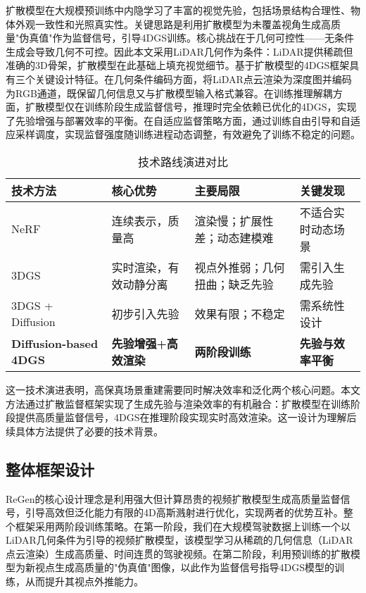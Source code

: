 扩散模型在大规模预训练中内隐学习了丰富的视觉先验，包括场景结构合理性、物体外观一致性和光照真实性。关键思路是利用扩散模型为未覆盖视角生成高质量"伪真值"作为监督信号，引导4DGS训练。核心挑战在于几何可控性——无条件生成会导致几何不可控。因此本文采用LiDAR几何作为条件：LiDAR提供稀疏但准确的3D骨架，扩散模型在此基础上填充视觉细节。基于扩散模型的4DGS框架具有三个关键设计特征。在几何条件编码方面，将LiDAR点云渲染为深度图并编码为RGB通道，既保留几何信息又与扩散模型输入格式兼容。在训练推理解耦方面，扩散模型仅在训练阶段生成监督信号，推理时完全依赖已优化的4DGS，实现了先验增强与部署效率的平衡。在自适应监督策略方面，通过训练自由引导和自适应采样调度，实现监督强度随训练进程动态调整，有效避免了训练不稳定的问题。

\begin{table}[htbp]
\centering
\caption{技术路线演进对比}
\label{tab:technical-evolution}
\small
\begin{tabular}{p{2.2cm}p{3.2cm}p{4cm}p{2.8cm}}
\toprule
\textbf{技术方法} & \textbf{核心优势} & \textbf{主要局限} & \textbf{关键发现} \\
\midrule
NeRF & 连续表示，质量高 & 渲染慢；扩展性差；动态建模难 & 不适合实时动态场景 \\
\midrule
3DGS & 实时渲染，有效动静分离 & 视点外推弱；几何扭曲；缺乏先验 & 需引入生成先验 \\
\midrule
3DGS + Diffusion & 初步引入先验 & 效果有限；不稳定 & 需系统性设计 \\
\midrule
\textbf{Diffusion-based 4DGS} & \textbf{先验增强+高效渲染} & \textbf{两阶段训练} & \textbf{先验与效率平衡} \\
\bottomrule
\end{tabular}
\end{table}

这一技术演进表明，高保真场景重建需要同时解决效率和泛化两个核心问题。本文方法通过扩散监督框架实现了生成先验与渲染效率的有机融合：扩散模型在训练阶段提供高质量监督信号，4DGS在推理阶段实现实时高效渲染。这一设计为理解后续具体方法提供了必要的技术背景。

\subsection{整体框架设计}

ReGen的核心设计理念是利用强大但计算昂贵的视频扩散模型生成高质量监督信号，引导高效但泛化能力有限的4D高斯溅射进行优化，实现两者的优势互补。整个框架采用两阶段训练策略。在第一阶段，我们在大规模驾驶数据上训练一个以LiDAR几何条件为引导的视频扩散模型，该模型学习从稀疏的几何信息（LiDAR点云渲染）生成高质量、时间连贯的驾驶视频。在第二阶段，利用预训练的扩散模型为新视点生成高质量的"伪真值"图像，以此作为监督信号指导4DGS模型的训练，从而提升其视点外推能力。

